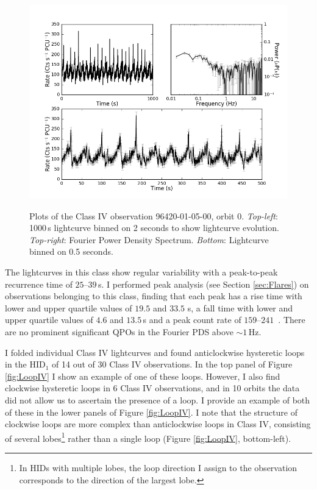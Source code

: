 \begin{figure}
    \includegraphics[width=0.8\columnwidth, trim = 0.6cm 0 3.9cm 0]{images/Jmulti.png}\\
    \captionsetup{singlelinecheck=off}
    \caption[Characteristic lightcurves and a power spectrum of Type IV variability.]{Plots of the Class IV observation 96420-01-05-00, orbit 0.  \textit{Top-left}: 1000\,s lightcurve binned on 2 seconds to show lightcurve evolution.  \textit{Top-right}: Fourier Power Density Spectrum.  \textit{Bottom}: Lightcurve binned on 0.5 seconds.}
   \label{fig:Jmulti}
\end{figure}

\par The lightcurves in this class show regular variability with a peak-to-peak recurrence time of $25$--$39$\,s.  I performed peak analysis (see Section \ref{sec:Flares}) on observations belonging to this class, finding that each peak has a rise time with lower and upper quartile values of $19.5$ and $33.5$ s, a fall time with lower and upper quartile values of $4.6$ and $13.5$\,s and a peak count rate of $159$--$241$\spcu\ .  There are no prominent significant QPOs in the Fourier PDS above $\sim1$\,Hz.
\par I folded individual Class IV lightcurves and found anticlockwise hysteretic loops in the HID$_1$ of 14 out of 30 Class IV observations.  In the top panel of Figure \ref{fig:LoopIV} I show an example of one of these loops.  However, I also find clockwise hysteretic loops in 6 Class IV observations, and in 10 orbits the data did not allow us to ascertain the presence of a loop.  I provide an example of both of these in the lower panels of Figure \ref{fig:LoopIV}.  I note that the structure of clockwise loops are more complex than anticlockwise loops in Class IV, consisting of several lobes\footnote{In HIDs with multiple lobes, the loop direction I assign to the observation corresponds to the direction of the largest lobe.} rather than a single loop (Figure \ref{fig:LoopIV}, bottom-left).

